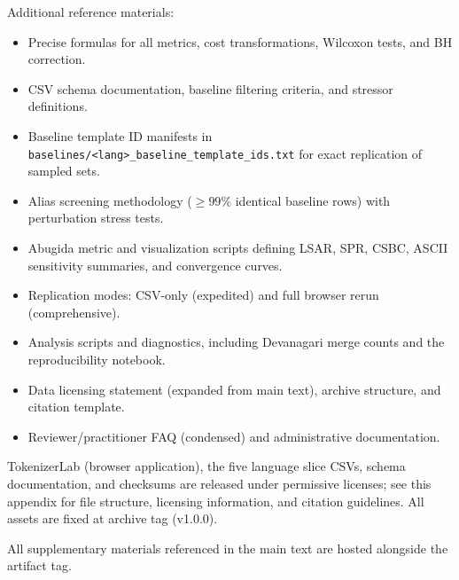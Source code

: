 \documentclass{article}
\begin{document}
Additional reference materials:
\begin{itemize}
    \item Precise formulas for all metrics, cost transformations, Wilcoxon tests, and BH correction.
    \item CSV schema documentation, baseline filtering criteria, and stressor definitions.
    \item Baseline template ID manifests in \texttt{baselines/<lang>\_baseline\_template\_ids.txt} for exact replication of sampled sets.
    \item Alias screening methodology ($\geq 99\%$ identical baseline rows) with perturbation stress tests.
    \item Abugida metric and visualization scripts defining LSAR, SPR, CSBC, ASCII sensitivity summaries, and convergence curves.
    \item Replication modes: CSV-only (expedited) and full browser rerun (comprehensive).
    \item Analysis scripts and diagnostics, including Devanagari merge counts and the reproducibility notebook.
    \item Data licensing statement (expanded from main text), archive structure, and citation template.
    \item Reviewer/practitioner FAQ (condensed) and administrative documentation.
\end{itemize}

TokenizerLab (browser application), the five language slice CSVs, schema documentation, and checksums are released under permissive licenses; see this appendix for file structure, licensing information, and citation guidelines. All assets are fixed at archive tag (v1.0.0).

All supplementary materials referenced in the main text are hosted alongside the artifact tag.



\end{document}
